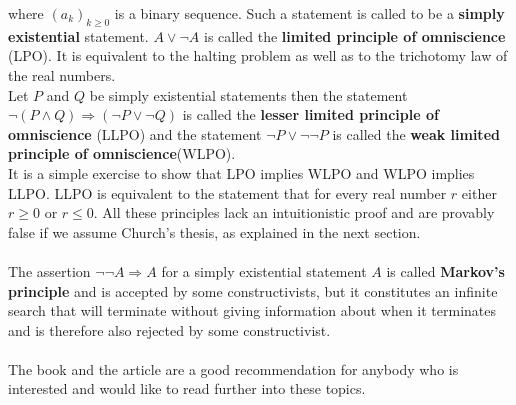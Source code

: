 \documentclass[11pt,a4paper,leqno]{report}
\numberwithin{equation}{chapter}
\begin{document}
where $(a_k)_{k\geq 0}$ is a binary sequence. Such a statement is called to be a \textbf{simply existential} statement. $A\vee\neg A$ is called the \textbf{limited principle of omniscience} (LPO). It is equivalent to the halting problem as well as to the trichotomy law of the real numbers. \\Let $P$ and $Q$ be simply existential statements then the statement $\neg(P\wedge Q)\Rightarrow (\neg P\vee\neg Q)$ is called the \textbf{lesser limited principle of omniscience} (LLPO) and the statement $\neg P\vee \neg\neg P$ is called the \textbf{weak limited principle of omniscience}(WLPO).\\ It is a simple exercise to show that LPO implies WLPO and WLPO implies LLPO. LLPO is equivalent to the statement that for every real number $r$ either $r\geq0$ or $r\leq0$. All these principles lack an intuitionistic proof and are provably false if we assume Church's thesis, as explained in the next section. \\
\\
The assertion $\neg\neg A\Rightarrow A$ for a simply existential statement $A$ is called \textbf{Markov's principle} and is accepted by some constructivists, but it constitutes an infinite search that will terminate without giving information about when it terminates and is therefore also rejected by some constructivist. \\
\\
The book \cite{VAR} and the article \cite{Dal} are a good recommendation for anybody who is interested and would like to read further into these topics. 
\end{document}
